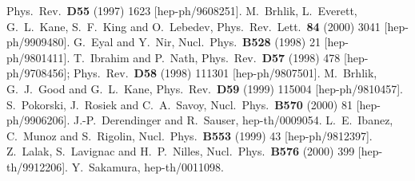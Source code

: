 \documentclass[a4paper,12pt]{article}
\begin{document}
\begin{thebibliography}{99}
	Phys.\ Rev.\ {\bf D55} (1997) 1623 [hep-ph/9608251]. 
	M.~Brhlik, L.~Everett, G.~L.~Kane, S.~F.~King and O.~Lebedev,
	Phys.\ Rev.\ Lett.\ {\bf 84} (2000) 3041 [hep-ph/9909480].
	G.~Eyal and Y.~Nir,
	Nucl.\ Phys.\ {\bf B528} (1998) 21 [hep-ph/9801411].
	T.~Ibrahim and P.~Nath,
	Phys.\ Rev.\ {\bf D57} (1998) 478 [hep-ph/9708456];
	Phys.\ Rev.\ {\bf D58} (1998) 111301 [hep-ph/9807501].
	M.~Brhlik, G.~J.~Good and G.~L.~Kane,
	Phys.\ Rev.\ {\bf D59} (1999) 115004 [hep-ph/9810457].
	S.~Pokorski, J.~Rosiek and C.~A.~Savoy,
	Nucl.\ Phys.\ {\bf B570} (2000) 81 [hep-ph/9906206].
	J.-P.~Derendinger and R.~Sauser,
hep-th/0009054.
	L.~E.~Ibanez, C.~Munoz and S.~Rigolin,
	Nucl.\ Phys.\ {\bf B553} (1999) 43 [hep-ph/9812397].
	Z.~Lalak, S.~Lavignac and H.~P.~Nilles,
	Nucl.\ Phys.\ {\bf B576} (2000) 399 [hep-th/9912206].
	Y.~Sakamura,
	hep-th/0011098.
\end{thebibliography}
\end{document}
